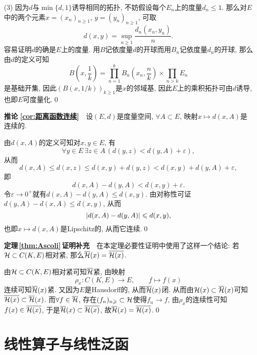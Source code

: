 \begin{Proof}
    (3) 因为$ d $与$ \min\{d,1\} $诱导相同的拓扑, 不妨假设每个$ E_n $上的度量$ d_n\leqslant 1 $. 那么对$ E $中的两个元素$ x=(x_n)_{n\geqslant 1} $, $ y=(y_n)_{n\geqslant 1} $, 可取
    \[
    d(x,y)=\sup_{n\geqslant 1}\frac{d_n(x_n,y_n)}{n}.
    \]
    容易证明$ d $的确是$ E $上的度量. 用$ B $记依度量$ d $的开球而用$ B_n $记依度量$ d_n $的开球, 那么由$ d $的定义可知
    \[
    B\left(x,\frac{1}{k}\right)=\prod_{n=1}^kB_n\left(x_n,\frac{n}{k}\right)\times\prod_{n>k}E_n
    \]
    是基础开集, 因此$ (B(x,1/k))_{k\geqslant 1} $是$ x $的邻域基, 因此$ E $上的乘积拓扑可由$ d $诱导, 也即$ E $可度量化.\qed

    \end{Proof}

    \textbf{推论\,\,\ref{cor:距离函数连续}}\ \ 设$ (E,d) $是度量空间, $ \forall A\subset E $, 映射$ x\mapsto d(x,A) $是连续的.
    \begin{Proof}
    由$ d(x,A) $的定义可知对$ x,y\in E $, 有
    \[
    \forall y\in E\,\exists z\in A\,(d(y,z)<d(y,A)+\varepsilon),
    \]
    从而
    \[
    d(x,A)\leqslant d(x,z)\leqslant d(x,y)+d(y,z)<d(x,y)+d(y,A)+\varepsilon,
    \]
    即
    \[
    d(x,A)-d(y,A)<d(x,y)+\varepsilon.
    \]
    令$ \varepsilon\to 0^+ $就有$ d(x,A)-d(y,A)\leqslant d(x,y) $. 由对称性可证$ d(y,A)-d(x,A)\leqslant d(x,y) $, 从而
    \[
    \left| d(x,A)-d(y,A) \right| \leqslant d(x,y),
    \]
    也即$ x\mapsto d(x,A) $是Lipschitz的, 从而它连续.\qed
    \end{Proof}

    \textbf{定理\,\ref{thm:Ascoli}\,证明补充}\ \ 在本定理必要性证明中使用了这样一个结论: 若$ \mathcal{H}\subset C(K,E) $相对紧, 那么$ \overline{\mathcal{H}}(x)=\overline{\mathcal{H}(x)} $.
    \begin{Proof}
    由$ \mathcal{H}\subset C(K,E) $相对紧可知$ \overline{\mathcal{H}} $紧, 由映射
    \[
    \rho_x : C(K,E)\to E,\qquad f\mapsto f(x)
    \]
    连续可知$ \overline{\mathcal{H}}(x) $紧. 又因为$ E $是Hausdorff的, 从而$ \overline{\mathcal{H}}(x) $闭. 从而由$ \mathcal{H}(x)\subset\overline{\mathcal{H}}(x) $可知$ \overline{\mathcal{H}(x)}\subset\overline{\mathcal{H}}(x) $. 而$ \forall f\in\overline{\mathcal{H}} $, 存在$ (f_n)_{n\geqslant}\subset\mathcal{H} $使得$ f_n\to f $, 由$ \rho_x $的连续性可知$ f(x)\in\overline{\mathcal{H}(x)} $, 于是$ \overline{\mathcal{H}}(x)\subset\overline{\mathcal{H}(x)} $, 故$ \overline{\mathcal{H}}(x)=\overline{\mathcal{H}(x)} $.\qed
    \end{Proof}

    \section{线性算子与线性泛函}

